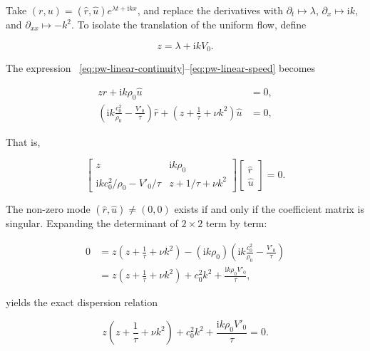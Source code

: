 \documentclass[11pt,a4paper,openany]{book}
\numberwithin{equation}{chapter}
\numberwithin{figure}{chapter}
\numberwithin{table}{chapter}
\begin{document}
Take $(r,u)=(\hat r,\hat u)e^{\lambda t+\mathrm{i}kx}$, and replace the derivatives with $\partial_t\mapsto\lambda$, $\partial_x\mapsto\mathrm{i}k$, and $\partial_{xx}\mapsto-k^2$. To isolate the translation of the uniform flow, define

\begin{equation}
z=\lambda+\mathrm{i}kV_0.
\label{eq:pw-z}
\end{equation}

The expression ~\eqref{eq:pw-linear-continuity}--\eqref{eq:pw-linear-speed} becomes

\begin{align}
z\hat r+\mathrm{i}k\rho_0\hat u&=0,\\
\left(\mathrm{i}k\frac{c_0^2}{\rho_0}-\frac{V'_0}{\tau}\right)\hat r
+\left(z+\frac1\tau+\nu k^2\right)\hat u&=0,
\end{align}

That is,

\begin{equation}
\begin{bmatrix}
z & \mathrm{i}k\rho_0\\[2pt]
\mathrm{i}k c_0^2/\rho_0-V'_0/\tau & z+1/\tau+\nu k^2
\end{bmatrix}
\begin{bmatrix}\hat r\\ \hat u\end{bmatrix}=0.
\label{eq:pw-matrix}
\end{equation}







The non-zero mode $(\hat r,\hat u)\ne(0,0)$ exists if and only if the coefficient matrix is singular. Expanding the determinant of $2\times2$ term by term:

\begin{align}
0
&=z\left(z+\frac1\tau+\nu k^2\right)
-(\mathrm{i}k\rho_0)
\left(\mathrm{i}k\frac{c_0^2}{\rho_0}-\frac{V'_0}{\tau}\right)\\
&=z\left(z+\frac1\tau+\nu k^2\right)
+c_0^2k^2+\frac{\mathrm{i}k\rho_0V'_0}{\tau},
\end{align}

yields the exact dispersion relation

\begin{equation}
z\left(z+\frac{1}{\tau}+\nu k^2\right)
+c_0^2k^2+\frac{\mathrm{i}k\rho_0V'_0}{\tau}=0.
\label{eq:pw-dispersion}
\end{equation}
\end{document}

